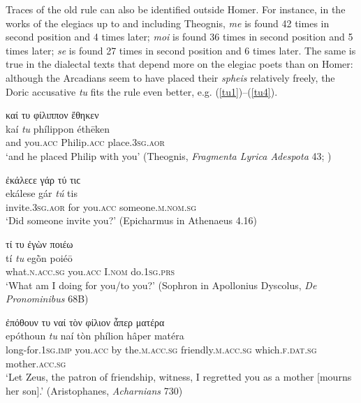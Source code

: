 Traces of the old rule can also be identified outside Homer. For instance, in the works of the elegiacs up to and including Theognis, \textit{me} is found 42 times in second position and 4 times later; \textit{moi} is found 36 times in second position and 5 times later; \textit{se} is found 27 times in second position and 6 times later. The same is true in the dialectal texts that depend more on the elegiac poets than on Homer: although the Arcadians seem to have placed their \textit{spheis} relatively freely, the Doric accusative \textit{tu}\label{tu} fits the rule even better, e.g. (\ref{tu1})--(\ref{tu4}).

\begin{exe}
\ex καί {τυ} φίλιππον ἔθηκεν\\
\gll kaí \emph{tu} phílippon éthēken\\
and you.\textsc{acc} Philip.\textsc{acc} place.\textsc{3sg.aor}\\
\trans `and he placed Philip with you' (Theognis, \textit{Fragmenta Lyrica Adespota} 43; \citealp[701]{Bergk1882})
\label{tu1}
\end{exe}

\begin{exe}
\ex ἐκάλεϲε γάρ {τύ} τιϲ\\
\gll ekálese gár \emph{tú} tis\\
invite.\textsc{3sg.aor} for you.\textsc{acc} someone.\textsc{m.nom.sg}\\
\trans `Did someone invite you?' (Epicharmus in Athenaeus 4.16)
\label{tu2}
\end{exe}

\begin{exe}
\ex τί {τυ} ἐγὼν ποιέω\\
\gll tí \emph{tu} egṑn poiéō\\
what.\textsc{n.acc.sg} you.\textsc{acc} I.\textsc{nom} do.\textsc{1sg.prs}\\
\trans `What am I doing for you/to you?' (Sophron in Apollonius Dyscolus, \textit{De Pronominibus} 68B)
\label{tu3}
\end{exe}

\begin{exe}
\ex ἐπόθουν {τυ} ναί τὸν φίλιον ἇπερ ματέρα\\
\gll epóthoun \emph{tu} naí tòn phílion hâper matéra\\
long-for.\textsc{1sg.imp} you.\textsc{acc} by the.\textsc{m.acc.sg} friendly.\textsc{m.acc.sg} which.\textsc{f.dat.sg} mother.\textsc{acc.sg}\\
\trans `Let Zeus, the patron of friendship, witness, I regretted you as a mother {[}mourns her son{]}.' (Aristophanes, \textit{Acharnians} 730)
\label{tu4}
\end{exe}

